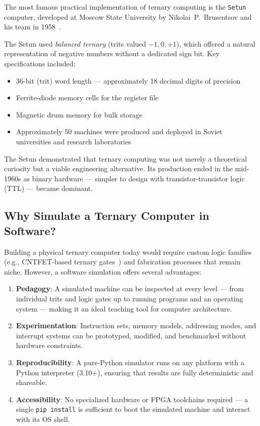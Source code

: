 \documentclass[11pt,a4paper]{article}
\begin{document}
The most famous practical implementation of ternary computing is the
\texttt{Setun} computer, developed at Moscow State University by
Nikolai~P.~Brusentsov and his team in 1958~\cite{brusentsov1965setun}.

The Setun used \emph{balanced ternary} (trits valued $-1, 0, +1$), which
offered a natural representation of negative numbers without a dedicated
sign bit.  Key specifications included:

\begin{itemize}
  \item 36-bit (trit) word length --- approximately 18 decimal digits of
        precision
  \item Ferrite-diode memory cells for the register file
  \item Magnetic drum memory for bulk storage
  \item Approximately 50 machines were produced and deployed in Soviet
        universities and research laboratories
\end{itemize}

The Setun demonstrated that ternary computing was not merely a theoretical
curiosity but a viable engineering alternative.  Its production ended in
the mid-1960s as binary hardware --- simpler to design with
transistor-transistor logic (TTL) --- became dominant.

\subsection{Why Simulate a Ternary Computer in Software?}

Building a physical ternary computer today would require custom logic
families (e.g., CNTFET-based ternary gates~\cite{lin2022ternary}) and
fabrication processes that remain niche.  However, a software simulation
offers several advantages:

\begin{enumerate}
  \item \textbf{Pedagogy}: A simulated machine can be inspected at every
        level --- from individual trits and logic gates up to running
        programs and an operating system --- making it an ideal teaching
        tool for computer architecture.
  \item \textbf{Experimentation}: Instruction sets, memory models,
        addressing modes, and interrupt systems can be prototyped,
        modified, and benchmarked without hardware constraints.
  \item \textbf{Reproducibility}: A pure-Python simulator runs on any
        platform with a Python interpreter (3.10+), ensuring that results
        are fully deterministic and shareable.
  \item \textbf{Accessibility}: No specialized hardware or FPGA toolchains
        required --- a single \texttt{pip install} is sufficient to boot
        the simulated machine and interact with its OS shell.
\end{enumerate}
\end{document}
